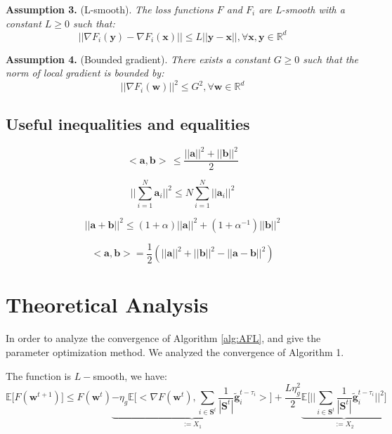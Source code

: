 \documentclass{article}
\begin{document}
\textbf{Assumption 3.} (L-smooth). \textit{The loss functions $F$ and  $F_i$ are L-smooth with a constant $L \ge 0$ such that:}
\begin{equation}
    ||\nabla F_i(\mathbf{y}) - \nabla F_i(\mathbf{x})|| \le L||\mathbf{y} - \mathbf{x}||, \forall \mathbf{x}, \mathbf{y} \in \mathbb{R}^d
    \label{assum:lsmooth}
\end{equation}

\textbf{Assumption 4.} (Bounded gradient). \textit{There exists a constant $G \ge 0$ such that the norm of local gradient is bounded by:}
\begin{equation}
    ||\nabla F_i(\mathbf{w})||^2 \le G^2, \forall \mathbf{w} \in \mathbb{R}^d
    \label{assum:boundedgradient}
\end{equation}

\subsection{Useful inequalities and equalities}
\begin{equation}
    <\textbf{a},\textbf{b}> \, \le \frac{||\textbf{a}||^2 + ||\textbf{b}||^2}{2}
    \label{equ:basic inequality}
\end{equation}

\begin{equation}
    ||\sum_{i=1}^{N} \textbf{a}_i||^2 \le N \sum_{i=1}^{N} ||\textbf{a}_i||^2
    \label{equ:vector norm}
\end{equation}

\begin{equation}
    ||\textbf{a} + \textbf{b}||^2 \le (1 + \alpha)||\textbf{a}||^2 + (1 + \alpha^{-1})||\textbf{b}||^2
    \label{equ:sum square}
\end{equation}

\begin{equation}
    <\textbf{a},\textbf{b}> = \frac{1}{2}(||\textbf{a}||^2 + ||\textbf{b}||^2 - ||\textbf{a} - \textbf{b}||^2)
    \label{equ:inner product}
\end{equation}


\section{Theoretical Analysis}

In order to analyze the convergence of Algorithm \ref{alg:AFL}, and give the parameter optimization method. We analyzed the convergence of Algorithm 1.

The function is $L-$smooth, we have:
\begin{equation}
\label{equ:first lsmooth}
    \mathbb{E}\big[F(\mathbf{w}^{t + 1})\big] \le F(\mathbf{w}^{t})  \underbrace{ - \eta_g \mathbb{E}\big[\big<\nabla F(\mathbf{w}^{t}), \sum_{i \in \mathbf{S}^t} \frac{1}{|\mathbf{S}^t|} \tilde{\mathbf{g}}_i^{t - \tau_i}\big>\big]}_{:= X_1} + \frac{L\eta_g^2}{2} \underbrace{\mathbb{E}\big[||\sum_{i \in \mathbf{S}^t} \frac{1}{|\mathbf{S}^t|} \tilde{\mathbf{g}}_i^{t - \tau_i}||^2\big]}_{:= X_2}
\end{equation}
\end{document}
